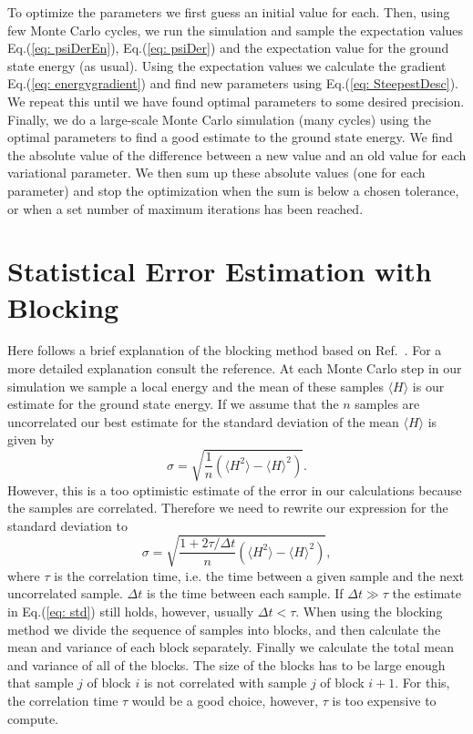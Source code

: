 \documentclass[../main.tex]{subfiles}
\begin{document}
To optimize the parameters we first guess an initial value for each. Then, using few Monte Carlo cycles, we run the simulation and sample the expectation values Eq.(\ref{eq: psiDerEn}), Eq.(\ref{eq: psiDer}) and the expectation value for the ground state energy (as usual). Using the expectation values we calculate the gradient Eq.(\ref{eq: energygradient}) and find new parameters using Eq.(\ref{eq: SteepestDesc}). We repeat this until we have found optimal parameters to some desired precision. Finally, we do a large-scale Monte Carlo simulation (many cycles) using the optimal parameters to find a good estimate to the ground state energy. We find the absolute value of the difference between a new value and an old value for each variational parameter. We then sum up these absolute values (one for each parameter) and stop the optimization when the sum is below a chosen tolerance, or when a set number of maximum iterations has been reached.


\section{Statistical Error Estimation with Blocking}

Here follows a brief explanation of the blocking method based on Ref.~\cite{FYS4411-LectureNotes}. For a more detailed explanation consult the reference.
At each Monte Carlo step in our simulation we sample a local energy and the mean of these samples $\langle H\rangle$ is our estimate for the ground state energy. If we assume that the $n$ samples are uncorrelated our best estimate for the standard deviation of the mean $\langle H\rangle$ is given by
\begin{equation}\label{eq: std}
    \sigma = \sqrt{\frac{1}{n}(\langle H^2\rangle - \langle H\rangle^2)}.
\end{equation}
However, this is a too optimistic estimate of the error in our calculations because the samples are correlated. Therefore we need to rewrite our expression for the standard deviation to
\begin{equation}
    \sigma = \sqrt{\frac{1+2\tau/\Delta t}{n}(\langle H^2\rangle - \langle H\rangle^2)},
\end{equation}
where $\tau$ is the correlation time, i.e. the time between a given sample and the next uncorrelated sample. $\Delta t$ is the time between each sample. If $\Delta t \gg \tau$ the estimate in Eq.(\ref{eq: std}) still holds, however, usually $\Delta t < \tau$. When using the blocking method we divide the sequence of samples into blocks, and then calculate the mean and variance of each block separately. Finally we calculate the total mean and variance of all of the blocks. The size of the blocks has to be large enough that sample $j$ of block $i$ is not correlated with sample $j$ of block $i+1$. For this, the correlation time $\tau$ would be a good choice, however, $\tau$ is too expensive to compute. 
\end{document}
